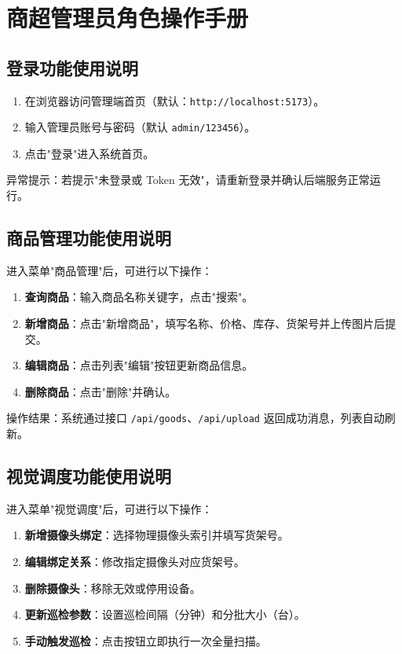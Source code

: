 
\setcounter{section}{0}
\renewcommand{\thesection}{\arabic{section}}
\renewcommand{\thesubsection}{\thesection.\arabic{subsection}}
\renewcommand{\thesubsubsection}{\thesubsection.\arabic{subsubsection}}

\section{商超管理员角色操作手册}

\subsection{登录功能使用说明}
\begin{enumerate}[leftmargin=2em]
  \item 在浏览器访问管理端首页（默认：\texttt{http://localhost:5173}）。
  \item 输入管理员账号与密码（默认 \texttt{admin/123456}）。
  \item 点击"登录"进入系统首页。
\end{enumerate}

异常提示：若提示"未登录或 Token 无效"，请重新登录并确认后端服务正常运行。

\subsection{商品管理功能使用说明}
进入菜单"商品管理"后，可进行以下操作：
\begin{enumerate}[leftmargin=2em]
  \item \textbf{查询商品}：输入商品名称关键字，点击"搜索"。
  \item \textbf{新增商品}：点击"新增商品"，填写名称、价格、库存、货架号并上传图片后提交。
  \item \textbf{编辑商品}：点击列表"编辑"按钮更新商品信息。
  \item \textbf{删除商品}：点击"删除"并确认。
\end{enumerate}

操作结果：系统通过接口 \texttt{/api/goods}、\texttt{/api/upload} 返回成功消息，列表自动刷新。

\subsection{视觉调度功能使用说明}
进入菜单"视觉调度"后，可进行以下操作：
\begin{enumerate}[leftmargin=2em]
  \item \textbf{新增摄像头绑定}：选择物理摄像头索引并填写货架号。
  \item \textbf{编辑绑定关系}：修改指定摄像头对应货架号。
  \item \textbf{删除摄像头}：移除无效或停用设备。
  \item \textbf{更新巡检参数}：设置巡检间隔（分钟）和分批大小（台）。
  \item \textbf{手动触发巡检}：点击按钮立即执行一次全量扫描。
\end{enumerate}

